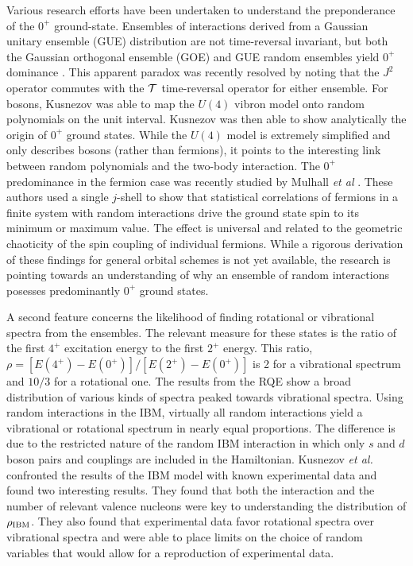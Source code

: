 \documentclass[preprint,rmp,aps,floatfix]{revtex4}
\begin{document}
Various research efforts have been undertaken to 
understand the preponderance of the $0^+$ ground-state. 
Ensembles of interactions derived from a Gaussian unitary ensemble (GUE) 
distribution are not
time-reversal invariant, but both the Gaussian orthogonal ensemble (GOE) 
and GUE random ensembles 
yield $0^+$ dominance \cite{bijker99}. This apparent paradox was recently
resolved \cite{vz02} by noting that the $J^2$ operator commutes with 
the ${\cal T}$ time-reversal operator for either ensemble. 
For bosons, Kusnezov \cite{kus00} was able to map the $U(4)$ vibron
model onto random polynomials on the unit interval. 
Kusnezov was then able to show analytically the origin of $0^+$ ground
states. While the $U(4)$ model is extremely simplified and only describes
bosons (rather than fermions),  it points to the 
interesting link between random polynomials and the two-body interaction. 
The $0^+$ predominance in the fermion case was recently studied by 
Mulhall {\em et al} \cite{mulhall00}. These authors used  
a single $j$-shell to show that statistical 
correlations of fermions in a finite system with random interactions 
drive the ground state spin to its minimum or 
maximum value. The effect is universal and related to the 
geometric chaoticity of the spin coupling of 
individual fermions. While a rigorous derivation of these findings for 
general orbital schemes is not yet available, the research is pointing towards
an understanding of why an ensemble of 
random interactions posesses predominantly $0^+$ ground states. 

A second feature concerns the likelihood of finding rotational or vibrational
spectra from the ensembles. The relevant measure for these states is the
ratio of the first $4^+$ excitation energy to the first $2^+$ energy. This
ratio, $\rho=[E(4^+)-E(0^+)]/[E(2^+)-E(0^+)]$ 
is 2 for a vibrational spectrum and $10/3$ for
a rotational one. The results from the RQE show a broad distribution
of various kinds of spectra peaked towards vibrational spectra.  
Using random interactions in the IBM,
virtually all random interactions yield a vibrational or rotational spectrum
in nearly equal proportions.  
The difference is due to the restricted nature of the random IBM interaction 
in which only $s$ and $d$ boson pairs and couplings are included in the 
Hamiltonian.  Kusnezov {\em et al.} \cite{kzc00} confronted the 
results of the IBM model with known experimental data 
and found two interesting results. They found
that both the interaction and the number of relevant valence nucleons
were key to understanding the distribution of $\rho_{\rm IBM}$. They also
found that experimental data favor rotational spectra over vibrational
spectra and were able to place limits on the choice of random variables
that would allow for a reproduction of experimental data. 
\end{document}
